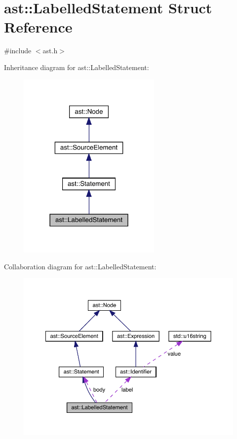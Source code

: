 \hypertarget{structast_1_1_labelled_statement}{}\section{ast\+:\+:Labelled\+Statement Struct Reference}
\label{structast_1_1_labelled_statement}


{\ttfamily \#include $<$ast.\+h$>$}



Inheritance diagram for ast\+:\+:Labelled\+Statement\+:
\nopagebreak
\begin{figure}[H]
\begin{center}
\leavevmode
\includegraphics[width=198pt]{structast_1_1_labelled_statement__inherit__graph}
\end{center}
\end{figure}


Collaboration diagram for ast\+:\+:Labelled\+Statement\+:
\nopagebreak
\begin{figure}[H]
\begin{center}
\leavevmode
\includegraphics[width=350pt]{structast_1_1_labelled_statement__coll__graph}
\end{center}
\end{figure}
